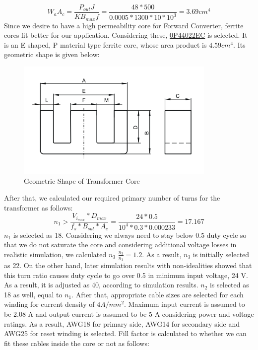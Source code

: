 \documentclass{article}
\newcommand\tab[1][1cm]{\hspace*{#1}}
\begin{document}
 \begin{equation*}
     W_aA_c=\frac{P_{out}J}{K B_{max} f}=\frac{48*500}{0.0005*1300*10*10^3}=3.69 cm^4
 \end{equation*}
 \tab Since we desire to have a high permeability core for Forward Converter, ferrite cores fit better for our application. Considering these, \href{https://www.mag-inc.com/Media/Magnetics/Datasheets/0P44022EC.pdf}{0P44022EC} is selected. It is an E shaped, P material type ferrite core, whose area product is $4.59 cm^4$. Its geometric shape is given below:
 \begin{figure}[H]
    \centering
    \includegraphics[scale=0.5]{transformer.PNG}
    \caption{Geometric Shape of Transformer Core}
    \label{fig:my_label}
\end{figure}
 \tab After that, we calculated our required primary number of turns for the transformer as follows:
 \begin{equation*}
    n_1>\frac{V_i_{max}*D_{max}}{f_s*B_{sat}*A_e}=\frac{24*0.5}{10^4*0.3*0.000233}=17.167
\end{equation*}
$n_1$ is selected as 18. Considering we always need to stay below 0.5 duty cycle so that we do not saturate the core and considering additional voltage losses in realistic simulation, we calculated $n_3$ $ \frac{n_3}{n_1}=1.2$. As a result, $n_3$ is initially selected as 22. On the other hand, later simulation results with non-idealities showed that this turn ratio causes duty cycle to go over 0.5 in minimum input voltage, 24 V. As a result, it is adjusted as 40, according to simulation results. $n_2$ is selected as 18 as well, equal to $n_1$. After that, appropriate cable sizes are selected for each winding for current density of $4 A/mm^2$. Maximum input current is assumed to be 2.08 A and output current is assumed to be 5 A considering power and voltage ratings. As a result, AWG18 for primary side, AWG14 for secondary side and AWG25 for reset winding is selected. Fill factor is calculated to whether we can fit these cables inside the core or not as follows:
\end{document}
